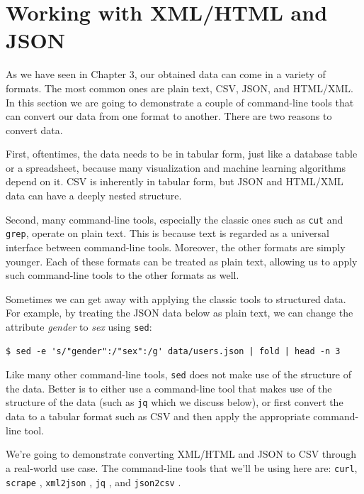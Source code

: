 \documentclass[
]{book}
\theoremstyle{definition}
\theoremstyle{definition}
\theoremstyle{definition}
\theoremstyle{remark}
\begin{document}
\hypertarget{working-with-xmlhtml-and-json}{%
\section{Working with XML/HTML and JSON}\label{working-with-xmlhtml-and-json}}

As we have seen in Chapter 3, our obtained data can come in a variety of formats. The most common ones are plain text, CSV, JSON, and HTML/XML. In this section we are going to demonstrate a couple of command-line tools that can convert our data from one format to another. There are two reasons to convert data.

First, oftentimes, the data needs to be in tabular form, just like a database table or a spreadsheet, because many visualization and machine learning algorithms depend on it. CSV is inherently in tabular form, but JSON and HTML/XML data can have a deeply nested structure.

Second, many command-line tools, especially the classic ones such as \texttt{cut} and \texttt{grep}, operate on plain text. This is because text is regarded as a universal interface between command-line tools. Moreover, the other formats are simply younger. Each of these formats can be treated as plain text, allowing us to apply such command-line tools to the other formats as well.

Sometimes we can get away with applying the classic tools to structured data. For example, by treating the JSON data below as plain text, we can change the attribute \emph{gender} to \emph{sex} using \texttt{sed}:

\begin{verbatim}
$ sed -e 's/"gender":/"sex":/g' data/users.json | fold | head -n 3
\end{verbatim}

Like many other command-line tools, \texttt{sed} does not make use of the structure of the data. Better is to either use a command-line tool that makes use of the structure of the data (such as \texttt{jq} which we discuss below), or first convert the data to a tabular format such as CSV and then apply the appropriate command-line tool.

We're going to demonstrate converting XML/HTML and JSON to CSV through a real-world use case. The command-line tools that we'll be using here are: \texttt{curl}, \texttt{scrape} \citep{scrape}, \texttt{xml2json} \citep{xml2json}, \texttt{jq} \citep{jq}, and \texttt{json2csv} \citep{json2csv}.
\end{document}
